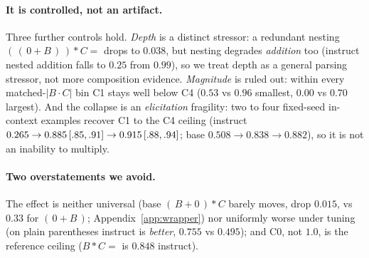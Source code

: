 \paragraph{It is controlled, not an artifact.} Three further controls hold. \emph{Depth} is
a distinct stressor: a redundant nesting $(\,(\,0 + B\,)\,) * C =$ drops to $0.038$, but
nesting degrades \emph{addition} too (instruct nested addition falls to $0.25$ from $0.99$), so
we treat depth as a general parsing stressor, not more composition evidence. \emph{Magnitude} is ruled out: within
every matched-$|B\!\cdot\!C|$ bin C1 stays well below C4 ($0.53$ vs $0.96$ smallest, $0.00$ vs
$0.70$ largest). And the collapse is an \emph{elicitation} fragility: two to four fixed-seed
in-context examples recover C1 to the C4 ceiling (instruct $0.265 \to 0.885\,{\scriptsize[.85,.91]}
\to 0.915\,{\scriptsize[.88,.94]}$; base $0.508 \to 0.838 \to 0.882$), so it is not an inability
to multiply.

\paragraph{Two overstatements we avoid.} The effect is neither universal (base $(\,B + 0\,) * C$
barely moves, drop $0.015$, vs $0.33$ for $(\,0 + B\,)$; Appendix~\ref{app:wrapper}) nor
uniformly worse under tuning (on plain parentheses instruct is \emph{better}, $0.755$ vs
$0.495$); and C0, not $1.0$, is the reference ceiling ($B * C =$ is $0.848$ instruct).
